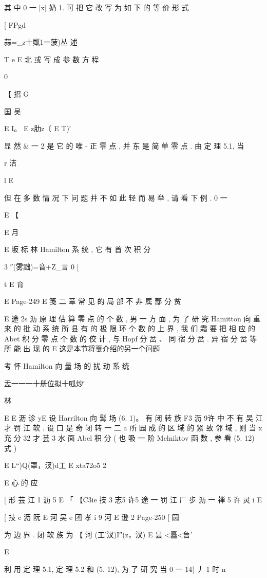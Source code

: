 {{{{{{{{{{{{{{{其 中 0 一 |x| 奶 1. 可 把 它 改 写 为 如 下 的 等 价 形 式

[
FPgd

蒜=_z十粼1一菠)丛
述

T e E 北
或 写 成 参 数 方 程

0

【 招
G

国 吴

E I。 E z肋z〔 E T)′

显 然 & 一 2 是 它 的 唯 - 正 零 点 , 并 东 是 简 单 零 点 . 由 定 理 5.1, 当

r 洁

l
E

但 在 多 数 情 况 下 问 题 并 不 如 此 轻 而 易 举 , 请 看 下 例 .
0 一

E
【

E 月

E 坂 标 林
Hamilton 系 统 , 它 有 首 次 积 分

3
″(雾黜)=音+Z_言 0 [

t
E 育

E
Page-249
E 笺 二 章 常 见 的 局 部 不 非 属 鄯 分 贫

E 途 2s 沥
原 理 估 算 零 点 的 个 数 , 男 一 方 面 , 为 了 研 究 Hamitton 向 重 来 的 批
动 系 统 所 县 有 的 极 限 环 个 数 的 上 界 , 我 们 霜 要 把 相 应 的 Abet 积 分
零 点 个 数 的 佼 计 , 与 Hopf 分 岔 、 同 宿 分 岔 . 异 宿 分 岔 等 所 能 出 现 的
E 这是本节将戛介绍的另一个问题

考 怀 Hamilton 向 量 场 的 扰 动 系 统

盂一一一十册位拟十呱炒′

林

E
E 沥 诊 yE
设 Harrilton 向 髯 场 (6. 1)。 有 闭 转 族
F3 沥 9许 中 不 有
吴 江 才 罚 江
软 . 设 口 是 奇 闭 转 一 二 a 所 园 成 的 区 域 的 紧 致 邻 域 , 则 当 x 充 分
32 才 芸 3 水
面 Abel 积 分 ( 也 吸 一 阶 Melniktov 函 数 , 参 看 (5. 12) 式 )

E L“)Q(罩，汊)d工 E xta72o5 2

E 心 的 应

[ 形 芸 江
1 沥 5
E
「 【C3ie 技 3 志5 许5 途 一 罚 江 厂 步 沥 一 禅 5 许 灵 i
E

[ 技 c 沥 阮
E 河 吴 e
团 孝 i 9 河 E 逊 2
Page-250
[ 圆

为 边 界 . 闭 软 族 为
【 河 {(工'汊)I″(z，汊) E 昙 <矗<鲁}'

E

利 用 定 理 5.1, 定 理 5.2 和 (5. 12), 为 了 研 究 当 0 一 14| 丿 1 时
n

}}}}}}}}}}}}}}}

